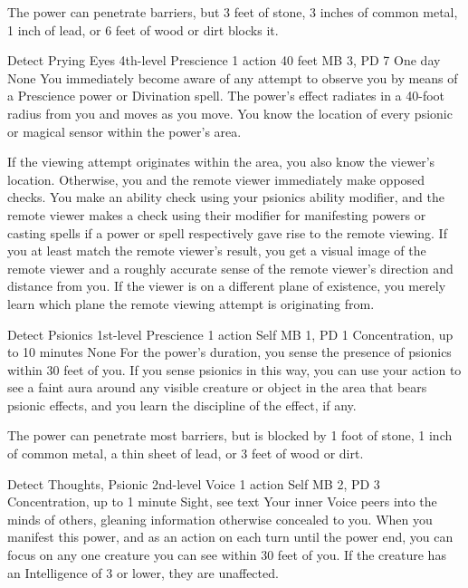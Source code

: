 The power can penetrate barriers, but 3 feet of stone, 3 inches
of common metal, 1 inch of lead, or 6 feet of wood or dirt
blocks it.

\DndPowerHeader%
    {Detect Prying Eyes\label{pwr:detect_prying_eyes}}
    {4th-level Prescience}
    {1 action}
    {40 feet}
    {MB 3, PD 7}
    {One day}
    {None}
You immediately become aware of any attempt
to observe you by means of a Prescience power or Divination
spell. The power's effect radiates in a 40-foot radius from
you and moves as you move. You know the location of every
psionic or magical sensor within the power's area.

If the viewing attempt originates within the area, you also
know the viewer's location. Otherwise, you and the remote
viewer immediately make opposed checks. You make an ability
check using your psionics ability modifier, and the remote
viewer makes a check using their modifier for manifesting
powers or casting spells if a power or spell respectively
gave rise to the remote viewing. If you at least match the
remote viewer's result, you get a visual image of the remote
viewer and a roughly accurate sense of the remote viewer's
direction and distance from you.
If the viewer is on a different plane of existence,
you merely learn which plane the remote viewing attempt is
originating from.

\DndPowerHeader%
    {Detect Psionics\label{pwr:detect_psionics}}
    {1st-level Prescience}
    {1 action}
    {Self}
    {MB 1, PD 1}
    {Concentration, up to 10 minutes}
    {None}
For the power's duration, you sense the
presence of psionics within 30 feet of you. If you sense psionics
in this way, you can use your action to see a faint aura around
any visible creature or object in the area that bears psionic
effects, and you learn the discipline of the effect, if any.

The power can penetrate most barriers, but is blocked by 1
foot of stone, 1 inch of common metal, a thin sheet of lead,
or 3 feet of wood or dirt.

\DndPowerHeader%
    {Detect Thoughts, Psionic\label{pwr:detect_thoughts_psionic}}
    {2nd-level Voice}
    {1 action}
    {Self}
    {MB 2, PD 3}
    {Concentration, up to 1 minute}
    {Sight, see text}
Your inner Voice peers into the minds of others,
gleaning information otherwise concealed to you.
When you manifest this power,
and as an action on each turn until the power end,
you can focus on any one creature you can see within 30 feet of you.
If the creature has an Intelligence of 3 or lower,
they are unaffected.

